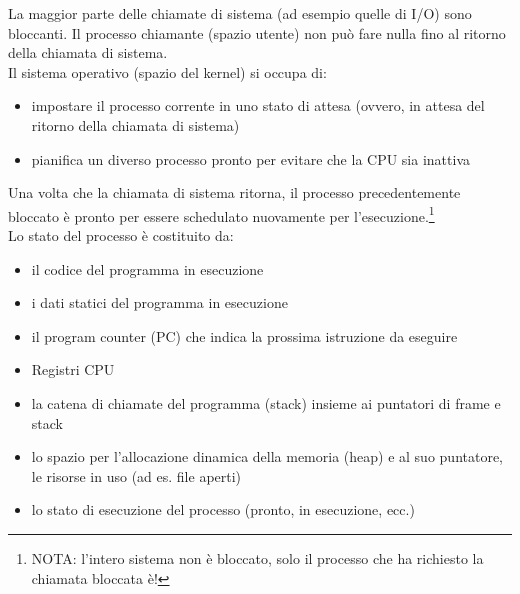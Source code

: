 \documentclass{article}
\begin{document}
La maggior parte delle chiamate di sistema (ad esempio quelle di I/O) sono bloccanti. Il processo chiamante (spazio utente) non può fare nulla fino al ritorno della chiamata di sistema.\\
 Il sistema operativo (spazio del kernel) si occupa di:
\begin{itemize}
    \item impostare il processo corrente in uno stato di attesa (ovvero, in attesa del ritorno della chiamata di sistema)
    \item  pianifica un diverso processo pronto per evitare che la CPU sia inattiva
\end{itemize} 
Una volta che la chiamata di sistema ritorna, il processo precedentemente bloccato è pronto per essere schedulato nuovamente per l'esecuzione.\footnote{NOTA: l'intero sistema non è bloccato, solo il processo che ha richiesto la chiamata bloccata è!}\\
Lo stato del processo è costituito da: 
\begin{itemize}
    \item il codice del programma in esecuzione
    \item i dati statici del programma in esecuzione
    \item il program counter (PC) che indica la prossima istruzione da eseguire
    \item Registri CPU
    \item la catena di chiamate del programma (stack) insieme ai puntatori di frame e stack
    \item lo spazio per l'allocazione dinamica della memoria (heap) e al suo puntatore, le risorse in uso (ad es. file aperti)
    \item lo stato di esecuzione del processo (pronto, in esecuzione, ecc.)
\end{itemize}
\end{document}
